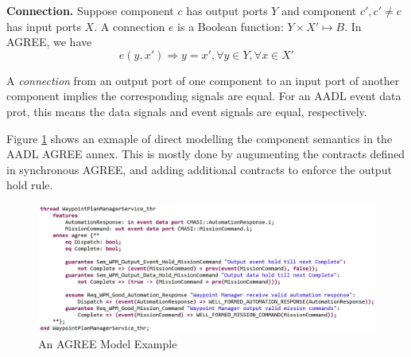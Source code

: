 {\bf Connection.}
Suppose component $c$ has output ports $Y$ and component $c', c' \neq c$ has input ports $X$. A connection $e$ is a Boolean function: $Y \times X' \mapsto B$. In AGREE, we have
\begin{equation} 
\label{eqn:connection}
e(y, x') \Rightarrow y = x', \forall y \in Y, \forall x \in X'
\end{equation} 

A \emph{connection} from an output port of one component to an input port of another component implies the corresponding signals are equal. For an AADL event data prot, this means the data signals and event signals are equal, respectively. 


Figure \ref{wpmAGREE} shows an exmaple of direct modelling the component semantics in the AADL AGREE annex. This is mostly done by augumenting the contracts defined in synchronous AGREE, and adding additional contracts to enforce the output hold rule.

\begin{figure}[ht!]
\centering
\includegraphics[width=130mm]{wpmAGREE.jpg}
\caption{An AGREE Model Example\label{wpmAGREE}}
\end{figure}

